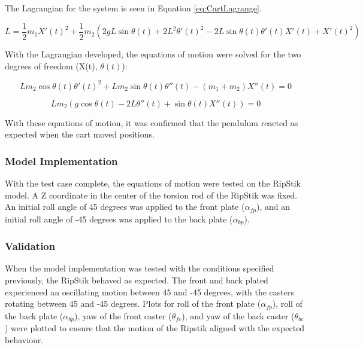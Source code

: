 The Lagrangian for the system is seen in Equation \ref{eq:CartLagrange}.

\begin{equation}
\label{eq:CartLagrange}
L = \frac{1}{2}m_{1}X'(t)^2+\frac{1}{2}m_{2}(2gL\sin\theta(t)+2L^2\theta'(t)^2-2L\sin\theta(t)\theta'(t)X'(t)+X'(t)^2) 
\end{equation}

With the Lagrangian developed, the equations of motion were solved for the two degrees of freedom (X(t), $\theta(t)$):

\begin{equation}
Lm_{2}\cos\theta(t)\theta'(t)^2+Lm_{2}\sin\theta(t)\theta''(t)-(m_{1}+m_{2})X''(t) = 0
\end{equation}

\begin{equation}
Lm_{2}(g\cos\theta(t)-2L\theta''(t)+\sin\theta(t)X''(t)) = 0
\end{equation}

With these equations of motion, it was confirmed that the pendulum reacted as expected when the cart moved positions.

\subsubsection{Model Implementation}

With the test case complete, the equations of motion were tested on the RipStik model. A Z coordinate in the center of the torsion rod of the RipStik was fixed.
An initial roll angle of 45 degrees was applied to the front plate ($\alpha_{fp}$), and an initial roll angle of -45 degrees was applied to the back plate ($\alpha_{bp}$). 

\subsubsection{Validation}

When the model implementation was tested with the conditions specified previously, the RipStik behaved as expected. 
The front and back plated experienced an oscillating motion between 45 and -45 degrees, with the casters rotating between 45 and -45 degrees. 
Plots for roll of the front plate ($\alpha_{fp}$), roll of the back plate ($\alpha_{bp}$), yaw of the front caster ($\theta_{fc}$), and yaw of the back caster ($\theta_{bc}$) were plotted to ensure that the motion of the Ripstik aligned with the expected behaviour.

